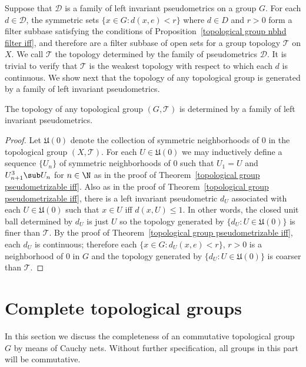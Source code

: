 Suppose that $\mathscr{D}$ is a family of left invariant pseudometrics on a group $G$. For each $d\in\mathscr{D}$, the symmetric sets $\{x\in G:d(x,e)<r\}$ where $d\in D$ and $r>0$ form a filter subbase satisfying the conditions of Proposition~\ref{topological group nbhd filter iff}, and therefore are a filter subbase of open sets for a group topology $\mathcal{T}$ on $X$. We call $\mathcal{T}$ the topology determined by the family of pseudometrics $\mathscr{D}$. It is trivial to verify that $\mathcal{T}$ is the weakest topology with respect to which each $d$ is continuous. We show next that the topology of any topological group is generated by a family of left invariant pseudometrics.
\begin{proposition}\label{topological group topology determined by metrics}
The topology of any topological group $(G,\mathcal{T})$ is determined by a family of left invariant pseudometrics.
\end{proposition}
\begin{proof}
Let $\mathfrak{U}(0)$ denote the collection of symmetric neighborhoods of $0$ in the topological group $(X,\mathcal{T})$. For each $U\in\mathfrak{U}(0)$ we may inductively define a sequence $\{U_n\}$ of symmetric neighborhoods of $0$ such that $U_1=U$ and $U_{n+1}^3\sub U_n$ for $n\in\N$ as in the proof of Theorem~\ref{topological group pseudometrizable iff}. Also as in the proof of Theorem~\ref{topological group pseudometrizable iff}, there is a left invariant pseudometric $d_U$ associated with each $U\in\mathfrak{U}(0)$ such that $x\in U$ iff $d(x,U)\leq 1$. In other words, the closed unit ball determined by $d_U$ is just $U$ so the topology generated by $\{d_U:U\in\mathfrak{U}(0)\}$ is finer than $\mathcal{T}$. By the proof of Theorem~\ref{topological group pseudometrizable iff}, each $d_U$ is continuous; therefore each $\{x\in G:d_U(x,e)<r\}$, $r>0$ is a neighborhood of $0$ in $G$ and the topology generated by $\{d_U:U\in\mathfrak{U}(0)\}$ is coarser than $\mathcal{T}$. 
\end{proof}
\section{Complete topological groups}
In this section we discuss the completeness of an commutative topological group $G$ by means of Cauchy nets. Without further specification, all groups in this part will be commutative.

